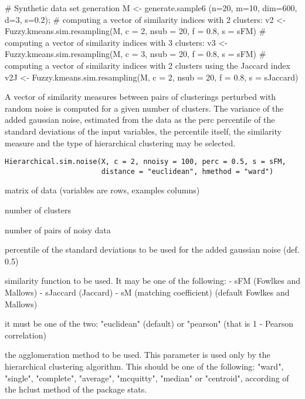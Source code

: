 \documentclass{article}
\begin{document}
\begin{Examples}
\begin{ExampleCode}
# Synthetic data set generation
M <- generate.sample6 (n=20, m=10, dim=600, d=3, s=0.2);
# computing a vector of similarity indices with 2 clusters:
v2 <- Fuzzy.kmeans.sim.resampling(M, c = 2, nsub = 20, f = 0.8, s = sFM)
# computing a vector of similarity indices with 3 clusters:
v3 <- Fuzzy.kmeans.sim.resampling(M, c = 3, nsub = 20, f = 0.8, s = sFM)
# computing a vector of similarity indices with 2 clusters using the Jaccard index
v2J <- Fuzzy.kmeans.sim.resampling(M, c = 2, nsub = 20, f = 0.8, s = sJaccard)
\end{ExampleCode}
\end{Examples}

\begin{Description}\relax
A vector of similarity measures between pairs of clusterings perturbed with random noise is computed for a given number of clusters. 
The variance of the added gaussian noise, estimated from the data as the perc percentile of the standard deviations of the input variables,
the percentile itself, the similarity measure and  the type of hierarchical clustering may be selected.
\end{Description}
\begin{Usage}
\begin{verbatim}
Hierarchical.sim.noise(X, c = 2, nnoisy = 100, perc = 0.5, s = sFM, 
                       distance = "euclidean", hmethod = "ward")
\end{verbatim}
\end{Usage}
\begin{Arguments}
\begin{ldescription}
\item[\code{X}] matrix of data (variables are rows, examples columns) 
\item[\code{c}] number of clusters 
\item[\code{nnoisy}] number of pairs of noisy data 
\item[\code{perc}] percentile of the standard deviations to be used for the added gaussian noise (def. 0.5) 
\item[\code{s}] similarity function to be used. It may be one of the following: 
- sFM (Fowlkes and Mallows)
- sJaccard (Jaccard)
- sM (matching coefficient)
(default Fowlkes and Mallows) 
\item[\code{distance}] it must be one of the two: "euclidean" (default) or "pearson" (that is 1 - Pearson correlation) 
\item[\code{hmethod}] the agglomeration method to be used. This parameter is used only by the hierarchical clustering algorithm.
This should be one of the following:
"ward", "single", "complete", "average", "mcquitty", "median" or "centroid", according of the hclust
method of the package stats. 
\end{ldescription}
\end{Arguments}
\end{document}
